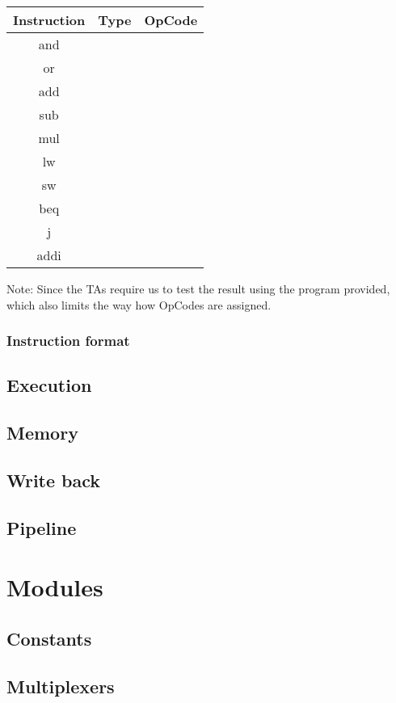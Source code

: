 \documentclass[11pt, a4paper, twoside]{IEEEtran}
\begin{document}
\begin{table}[h]
	\centering
	\begin{tabular}{|c|cc|}
	\hline
    Instruction & Type & OpCode \\
    \hline
    and & & \\
    or & & \\
    add & & \\
    sub & & \\
    mul & & \\
    lw & & \\
    sw & & \\
    beq & & \\
    j & & \\
    addi & & \\
    \hline
	\end{tabular}
\end{table}

Note: Since the TAs require us to test the result using the program provided, which also limits the way how OpCodes are assigned.\\

\subsubsection{Instruction format}

\subsection{Execution}
\subsection{Memory}
\subsection{Write back}
\subsection{Pipeline}
	
\section{Modules}
	\subsection{Constants}
	\subsection{Multiplexers}
\end{document}

